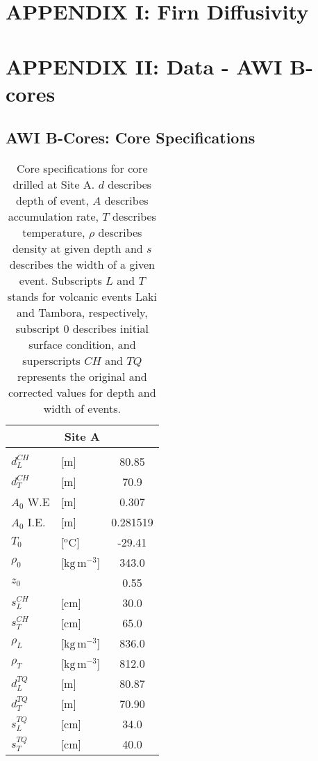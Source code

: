 \documentclass[../../CompleteThesis2/Complete_2ndDraft.tex]{subfiles}
\begin{document}
	\section[Appendix I: Firn Diffusivity]{APPENDIX I: Firn Diffusivity}
	\label{AppI:FirnDiffusivity}


	\newpage	
	\section[Appendix II: AWI B-cores]{APPENDIX II: Data - AWI B-cores}
	\label{AppII:Data_AWI}
	
	
	\subsection[Core Specifications]{AWI B-Cores: Core Specifications}
	\begin{table}[h]
		\centering
		\begin{tabular}{l l|c}
			\multicolumn{3}{c}{\textbf{Site A}} \\[0.1cm] 
			\hline 
			&& \\
			$d_{L}^{CH}$ & [m] & 80.85 \\[0.15cm]
			$d_{T}^{CH}$ & [m] & 70.9 \\[0.15cm]
			$A_0$ W.E & [m] & 0.307 \\[0.15cm]
			$A_0$ I.E. & [m] & 0.281519 \\[0.15cm]
			$T_0$ & [$^{\text{o}}$C] & -29.41 \\[0.15cm]
			$\rho_0$ & [$\text{kg}\,\text{m}^{-3}$] & 343.0\\[0.15cm]
			$z_0$ & & 0.55 \\[0.15cm]
			$s_L^{CH}$ & [cm] & 30.0 \\[0.15cm]
			$s_T^{CH}$ & [cm] & 65.0 \\[0.15cm]
			$\rho_L$ & [$\text{kg}\,\text{m}^{-3}$] & 836.0 \\[0.15cm]
			$\rho_T$ & [$\text{kg}\,\text{m}^{-3}$] & 812.0 \\[0.15cm]		
			$d_{L}^{TQ}$ & [m] & 80.87 \\[0.15cm]
			$d_{T}^{TQ}$ & [m] & 70.90 \\[0.15cm]
			$s_L^{TQ}$ & [cm] & 34.0 \\[0.15cm]
			$s_T^{TQ}$ & [cm] & 40.0 \\[0.15cm]
			
		\end{tabular}
		\caption[Core specifications for core drilled at Site A.]{\small Core specifications for core drilled at Site A. $d$ describes depth of event, $A$ describes accumulation rate, $T$ describes temperature, $\rho$ describes density at given depth and $s$ describes the width of a given event. Subscripts $L$ and $T$ stands for volcanic events Laki and Tambora, respectively, subscript $0$ describes initial surface condition, and superscripts $CH$ and $TQ$ represents the original and corrected values for depth and width of events.}
		\label{Tab:AWI_Bcores_CoreSpecs}
	\end{table}
	
\end{document}
